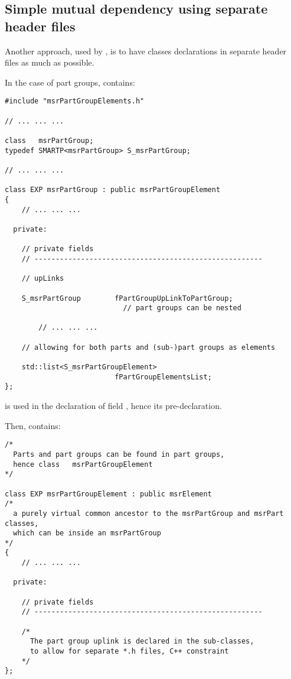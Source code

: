 

\subsection{Simple mutual dependency using separate header files}

Another approach, used by \mf, is to have classes declarations in separate header files as much as possible.

In the case of part groups,  contains:
\begin{lstlisting}[language=CPlusPlus]
#include "msrPartGroupElements.h"

// ... ... ...

class   msrPartGroup;
typedef SMARTP<msrPartGroup> S_msrPartGroup;

// ... ... ...

class EXP msrPartGroup : public msrPartGroupElement
{
	// ... ... ...

  private:

    // private fields
    // ------------------------------------------------------

    // upLinks

    S_msrPartGroup        fPartGroupUpLinkToPartGroup;
                            // part groups can be nested

		// ... ... ...

    // allowing for both parts and (sub-)part groups as elements

    std::list<S_msrPartGroupElement>
                          fPartGroupElementsList;
};
\end{lstlisting}

 is used in the declaration of field , hence its pre-declaration.

Then,  contains:
\begin{lstlisting}[language=CPlusPlus]
/*
  Parts and part groups can be found in part groups,
  hence class   msrPartGroupElement
*/

class EXP msrPartGroupElement : public msrElement
/*
  a purely virtual common ancestor to the msrPartGroup and msrPart classes,
  which can be inside an msrPartGroup
*/
{
	// ... ... ...

  private:

    // private fields
    // ------------------------------------------------------

    /*
      The part group uplink is declared in the sub-classes,
      to allow for separate *.h files, C++ constraint
    */
};
\end{lstlisting}

